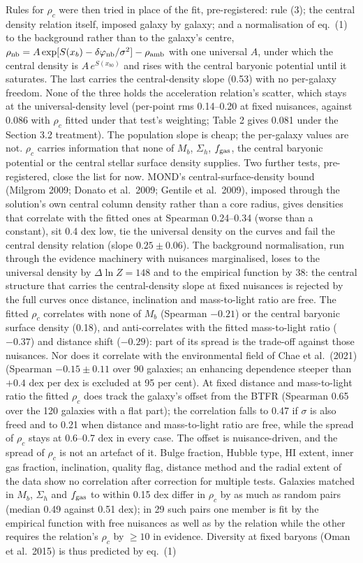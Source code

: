 \documentclass[
  10pt,
]{article}
\begin{document}
Rules for $\rho_c$ were then tried in place of the fit, pre-registered: rule (3); the central density relation itself, imposed galaxy by galaxy; and a normalisation of eq.~(1) to the background rather than to the galaxy's centre, $\rho_{\rm nb}=A\exp[S(x_b)-\delta\varphi_{\rm nb}/\sigma^2]-\rho_{\rm amb}$ with one universal $A$, under which the central density is $A\,e^{S(x_{b0})}$ and rises with the central baryonic potential until it saturates. The last carries the central-density slope (0.53) with no per-galaxy freedom. None of the three holds the acceleration relation's scatter, which stays at the universal-density level (per-point rms 0.14--0.20 at fixed nuisances, against 0.086 with $\rho_c$ fitted under that test's weighting; Table 2 gives 0.081 under the Section 3.2 treatment). The population slope is cheap; the per-galaxy values are not. $\rho_c$ carries information that none of $M_b$, $\Sigma_h$, $f_{\rm gas}$, the central baryonic potential or the central stellar surface density supplies. Two further tests, pre-registered, close the list for now. MOND's central-surface-density bound (Milgrom 2009; Donato et al.~2009; Gentile et al.~2009), imposed through the solution's own central column density rather than a core radius, gives densities that correlate with the fitted ones at Spearman 0.24--0.34 (worse than a constant), sit 0.4 dex low, tie the universal density on the curves and fail the central density relation (slope $0.25\pm0.06$). The background normalisation, run through the evidence machinery with nuisances marginalised, loses to the universal density by $\Delta\ln Z=148$ and to the empirical function by 38: the central structure that carries the central-density slope at fixed nuisances is rejected by the full curves once distance, inclination and mass-to-light ratio are free. The fitted $\rho_c$ correlates with none of $M_b$ (Spearman $-0.21$) or the central baryonic surface density (0.18), and anti-correlates with the fitted mass-to-light ratio ($-0.37$) and distance shift ($-0.29$): part of its spread is the trade-off against those nuisances. Nor does it correlate with the environmental field of Chae et al.~(2021) (Spearman $-0.15\pm0.11$ over 90 galaxies; an enhancing dependence steeper than $+0.4$ dex per dex is excluded at 95 per cent). At fixed distance and mass-to-light ratio the fitted $\rho_c$ does track the galaxy's offset from the BTFR (Spearman 0.65 over the 120 galaxies with a flat part); the correlation falls to 0.47 if $\sigma$ is also freed and to 0.21 when distance and mass-to-light ratio are free, while the spread of $\rho_c$ stays at 0.6--0.7 dex in every case. The offset is nuisance-driven, and the spread of $\rho_c$ is not an artefact of it. Bulge fraction, Hubble type, HI extent, inner gas fraction, inclination, quality flag, distance method and the radial extent of the data show no correlation after correction for multiple tests. Galaxies matched in $M_b$, $\Sigma_h$ and $f_{\rm gas}$ to within 0.15 dex differ in $\rho_c$ by as much as random pairs (median 0.49 against 0.51 dex); in 29 such pairs one member is fit by the empirical function with free nuisances as well as by the relation while the other requires the relation's $\rho_c$ by $\geq10$ in evidence. Diversity at fixed baryons (Oman et al.~2015) is thus predicted by eq.~(1) 
\end{document}
